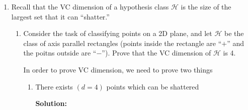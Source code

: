 \documentclass[12pt]{article}
\renewcommand{\Pr}[1]{\text{Pr}[ #1 ]}
\begin{document}
\begin{enumerate}
\begin{enumerate}
\begin{align*}
  \max_{x\in X}\Pr{A(x) = y} &\leq \sum_{i=1}^{c|Y|} \frac{1}{|Y|}\\
                           &\leq c|Y|\frac{1}{|Y|} = c
\end{align*}


\item Show that this implies that for any distribution $\mathcal{D}$ over $X$, $\text{Pr}_{x\sim \mathcal{D}}[A(x) = y] \leq c$.

{\bf Solution:}

This problem is asking the probability that for an $x$ in our distribution that our classifier is able to classify it correctly. In other words

\begin{align*}
  P(A(x) = y | x) &= \frac{p(A(x) = y \cap x)}{p(x)}
\intertext{Where $x$ is bounded by $|Y|$. The entire set of $X$ is bounded by $c|Y|$, but each independent value of $x$ can map to anything in $Y$. Therefore, we have the domain as being}
  P(A(x) = y | x) &= \frac{c|Y|}{|Y|} = c
\end{align*}

This is an upper bound on the probability, which does not account for repetition.

\end{enumerate}

\item Recall that the VC dimension of a hypothesis class $\mathcal{H}$ is the size of the largest set that it can ``shatter.''

\begin{enumerate}
\item Consider the task of classifying points on a 2D plane, and let $\mathcal{H}$ be the class of axis parallel rectangles (points inside the rectangle are ``$+$'' and the poitns outside are ``$-$''). Prove that the VC dimension of $\mathcal{H}$ is 4.

In order to prove VC dimension, we need to prove two things

\begin{enumerate}
\item There exists $(d = 4)$ points which can be shattered

{\bf Solution:}

\end{enumerate}
\end{enumerate}
\end{enumerate}
\end{document}
